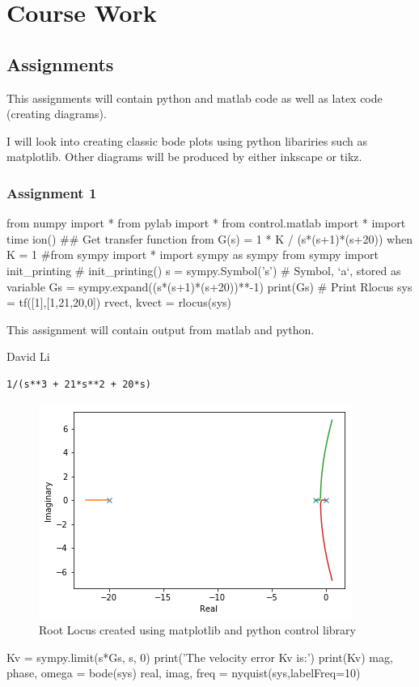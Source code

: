 \documentclass{scrreprt}
\theoremstyle{plain}
\theoremstyle{definition}
\theoremstyle{remark}
\begin{document}
\part{Course Work}


\chapter{Assignments}
This assignments will contain python and matlab code as well as latex code (creating diagrams).

I will look into creating classic bode plots using python libariries such as matplotlib. Other diagrams will be produced by either inkscape or tikz.
\section{Assignment 1}

\begin{pythonscript}
from numpy import *
from pylab import * 
from control.matlab import *   
import time
ion()
## Get transfer function from G(s) = 1 * K / (s*(s+1)*(s+20)) when K = 1
#from sympy import *
import sympy as sympy
from sympy import init_printing
# %
init_printing()
s = sympy.Symbol('s')  # Symbol, `a`, stored as variable
Gs = sympy.expand((s*(s+1)*(s+20))**-1)
print(Gs)
# Print Rlocus
sys = tf([1],[1,21,20,0])
rvect, kvect = rlocus(sys)
\end{pythonscript}
\epigraph{This assignment will contain output from matlab and python.}{David Li}
\begin{verbatim}
1/(s**3 + 21*s**2 + 20*s)
\end{verbatim}
\begin{figure}
	\includegraphics[width=0.7\linewidth]{Assignments/A1/ipython_files/qt_img486735758753796}
	\caption{Root Locus created using matplotlib and python control library}
	\label{fig:qtimg486735758753796}
\end{figure}
\begin{pythonscript}
	Kv = sympy.limit(s*Gs, s, 0)
	print('The velocity error Kv is:')
	print(Kv)
	mag, phase, omega = bode(sys)
	real, imag, freq = nyquist(sys,labelFreq=10)
\end{pythonscript}
\end{document}
